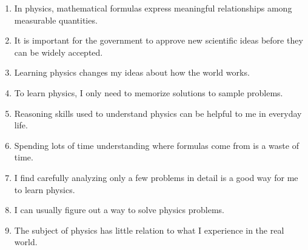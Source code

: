 \documentclass[addpoints,12pt]{exam}
\begin{document}
\begin{enumerate}
\item In physics, mathematical formulas express meaningful relationships among measurable quantities.
\begin{center}\end{center}

\clearpage

\item It is important for the government to approve new scientific ideas before they can be widely accepted.
\begin{center}\end{center}

\item Learning physics changes my ideas about how the world works.
\begin{center}\end{center}

\item To learn physics, I only need to memorize solutions to sample problems.
\begin{center}\end{center}

\item Reasoning skills used to understand physics can be helpful to me in everyday life.
\begin{center}\end{center}

\item Spending lots of time understanding where formulas come from is a waste of time.
\begin{center}\end{center}

\item I find carefully analyzing only a few problems in detail is a good way for me to learn physics.
\begin{center}\end{center}

\item I can usually figure out a way to solve physics problems.
\begin{center}\end{center}

\item The subject of physics has little relation to what I experience in the real world.
\begin{center}\end{center}


\end{enumerate}
\end{document}
